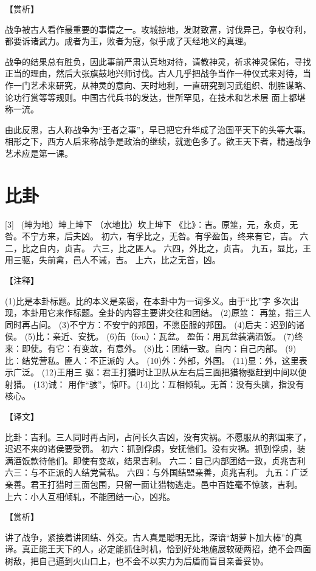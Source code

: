 \documentclass[12pt,UTF8]{ctexbook}
\begin{document}
【赏析】

战争被古人看作最重要的事情之一。攻城掠地，发财致富，讨伐异己，争权夺利，都要诉诸武力。成者为王，败者为寇，似乎成了天经地义的真理。

战争的结果总有胜负，因此事前严肃认真地对待，请教神灵，祈求神灵保佑，寻找正当的理由，然后大张旗鼓地兴师讨伐。古人几乎把战争当作一种仪式来对待，当作一门艺术来研究，从神灵的意向、天时地利，一直研究到习武组织、制胜谋略、论功行赏等等规则。中国古代兵书的发达，世所罕见，在技术和艺术层 面上都堪称一流。

由此反思，古人称战争为“王者之事”，早已把它升华成了治国平天下的头等大事。相形之下，西方人后来称战争是政治的继续，就逊色多了。欲王天下者，精通战争艺术应是第一课。

\chapter{比卦}
[3] \ (坤为地）坤上坤下
（水地比）坎上坤下
《比》：吉。原筮，元，永贞，无咎。不宁方来，后夫凶。
初六，有孚比之，无咎。有孚盈缶，终来有它，吉。
六二，比之自内，贞吉。
六三，比之匪人。
六四，外比之，贞吉。
九五，显比，王用三驱，失前禽，邑人不诫，吉。
上六，比之无首，凶。

【注释】

(1)比是本卦标题。比的本义是亲密，在本卦中为一词多义。由于“比”字 多次出现，本卦用它来作标题。全卦的内容主要讲交往和团结。
(2)原筮： 再筮，指三人同时再占问。
(3)不宁方：不安宁的邦国，不愿臣服的邦国。
(4)后夫：迟到的诸侯。
(5)比：亲近、安抚。
(6)缶（fou）：瓦盆。 盈缶：用瓦盆装满酒饭。
(7)终来：即使。有它：有变故，有意外。
(8)比：团结一致。自内：自己内部。
(9)比：结党营私。匪人：不正派的 人。
(10)外：外部，外国。
(11)显：外，这里表示广泛。
(12)王用三 驱：君王打猎时让卫队从左右后三面把猎物驱赶到中间以便射猎。
(13)诫： 用作“骇”，惊吓。(14)比：互相倾轧。无首：没有头脑，指没有核心。

【译文】

比卦：吉利。三人同时再占问，占问长久吉凶，没有灾祸。不愿服从的邦国来了，迟迟不来的诸侯要受罚。
初六：抓到俘虏，安抚他们。没有灾祸。抓到俘虏，装满酒饭款待他们。即使有变故，结果吉利。
六二：自己内部团结一致，贞兆吉利
六三：与不正派的人结党营私。
六四：与外国结盟亲善，贞兆吉利。
九五：广泛亲善。君王打猎时三面包围，只留一面让猎物逃走。邑中百姓毫不惊骇，吉利。 上六：小人互相倾轧，不能团结一心，凶兆。

【赏析】

讲了战争，紧接着讲团结、外交。古人真是聪明无比，深谙“胡萝卜加大棒”的真谛。真正能王天下的人，必定能抓住时机，恰到好处地施展软硬两招，绝不会四面树敌，把自己逼到火山口上，也不会不以实力为后盾而盲目亲善妥协。
\end{document}
